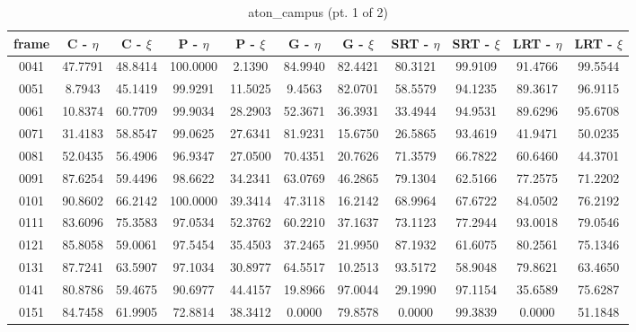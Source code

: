 \begin{appendices}
\begin{table}
\centering
\caption{aton\_campus (pt. 1 of 2)}
\begin{tabular}{ |c|c|c|c|c|c|c|c|c|c|c| }
	\hline
\textbf{frame} &  \textbf{C - $\eta$} &  \textbf{C - $\xi$} &  \textbf{P - $\eta$} &  \textbf{P - $\xi$} &  \textbf{G - $\eta$} &  \textbf{G - $\xi$} &  \textbf{SRT - $\eta$} &  \textbf{SRT - $\xi$} &  \textbf{LRT - $\eta$} &  \textbf{LRT - $\xi$} \\
\hline
\hline
0041 &  47.7791 &  48.8414 &   100.0000 &  2.1390 &   84.9940 &  82.4421 &   80.3121 &  99.9109 &   91.4766 &  99.5544    \\
\hline
0051 &  8.7943 &  45.1419 &   99.9291 &  11.5025 &   9.4563 &  82.0701 &   58.5579 &  94.1235 &   89.3617 &  96.9115    \\
\hline
0061 &  10.8374 &  60.7709 &   99.9034 &  28.2903 &   52.3671 &  36.3931 &   33.4944 &  94.9531 &   89.6296 &  95.6708    \\
\hline
0071 &  31.4183 &  58.8547 &   99.0625 &  27.6341 &   81.9231 &  15.6750 &   26.5865 &  93.4619 &   41.9471 &  50.0235    \\
\hline
0081 &  52.0435 &  56.4906 &   96.9347 &  27.0500 &   70.4351 &  20.7626 &   71.3579 &  66.7822 &   60.6460 &  44.3701    \\
\hline
0091 &  87.6254 &  59.4496 &   98.6622 &  34.2341 &   63.0769 &  46.2865 &   79.1304 &  62.5166 &   77.2575 &  71.2202    \\
\hline
0101 &  90.8602 &  66.2142 &   100.0000 &  39.3414 &   47.3118 &  16.2142 &   68.9964 &  67.6722 &   84.0502 &  76.2192    \\
\hline
0111 &  83.6096 &  75.3583 &   97.0534 &  52.3762 &   60.2210 &  37.1637 &   73.1123 &  77.2944 &   93.0018 &  79.0546    \\
\hline
0121 &  85.8058 &  59.0061 &   97.5454 &  35.4503 &   37.2465 &  21.9950 &   87.1932 &  61.6075 &   80.2561 &  75.1346    \\
\hline
0131 &  87.7241 &  63.5907 &   97.1034 &  30.8977 &   64.5517 &  10.2513 &   93.5172 &  58.9048 &   79.8621 &  63.4650    \\
\hline
0141 &  80.8786 &  59.4675 &   90.6977 &  44.4157 &   19.8966 &  97.0044 &   29.1990 &  97.1154 &   35.6589 &  75.6287   \\
\hline
0151 &  84.7458 &  61.9905 &   72.8814 &  38.3412 &   0.0000 &  79.8578 &   0.0000 &  99.3839 &   0.0000 &  51.1848   \\


\end{tabular}
\end{table}
\end{appendices}
